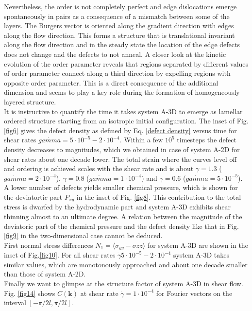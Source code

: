 \documentclass[8.5pt,twoside,twocolumn]{article}
\newcommand{\e}[1]{\cdot10^{#1}}
\newcommand{\gd}{\dot{\gamma}}
\begin{document}
Nevertheless, the order is not completely perfect and edge dislocations emerge spontaneously in pairs as a consequence of a mismatch between some of the layers.
The Burgers vector is oriented along the gradient direction with edges along the flow direction.
This forms a structure that is translational invariant along the flow direction and in the steady state the location of the edge defects does not change and the defects to not anneal.
A closer look at the kinetic evolution of the order parameter reveals that regions separated by different values of order parameter connect along a third direction by expelling regions with opposite order parameter.
This is a direct consequence of the additional dimension and seems to play a key role during the formation of homogeneously layered structure.\\
It is instructive to quantify the time it takes system A-3D to emerge as lamellar ordered structure starting from an isotropic initial configuration.  
The inset of Fig. \ref{fig6} gives the defect density as defined by Eq. \ref{defect density} versus time for shear rates $\dot{gamma}=5\cdot10^{-5}-2\cdot10^{-4}$. 
Within a few $10^5$ timesteps the defect density decreases to magnitudes, which we obtained in case of system A-2D for shear rates about one decade lower.
The total strain where the curves level off and ordering is achieved scales with the shear rate and is about $\gamma=1.3$ ($\dot{gamma}=2\cdot10^{-4}$), $\gamma=0.8$ ($\dot{gamma}=1\cdot10^{-4}$) and $\gamma=0.6$ ($\dot{gamma}=5\cdot10^{-5}$).
 \\
A lower number of defects yields smaller chemical pressure, which is shown for the deviatortic part $P_{xy}$ in the inset of Fig. \ref{fig8}.
This contribution to the total stress is dwarfed by the hydrodynamic part and system A-3D exhibits shear thinning almost to an ultimate degree.
A relation between the magnitude of the deviatoric part of the chemical pressure and the defect density like that in Fig. \ref{fig9} in the two-dimensional case cannot be deduced.\\
First normal stress differences $N_1=\langle\sigma_{yy}-\sigma{zz}\rangle$ for system A-3D are shown in the inset of Fig.\ref{fig10}.
For all shear rates $\gd5\e{-5}-2\e{-4}$ system A-3D takes similar values, which are monotonously approached and about one decade smaller than those of system A-2D.\\ 
Finally we want to glimpse at the structure factor of system A-3D in shear flow.
Fig. \ref{fig14} shows $C({\bm k})$ at shear rate $\gd=1\e{-4}$ for Fourier vectors on the interval $[-\pi/2 l, \pi/ 2 l]$.
\end{document}
